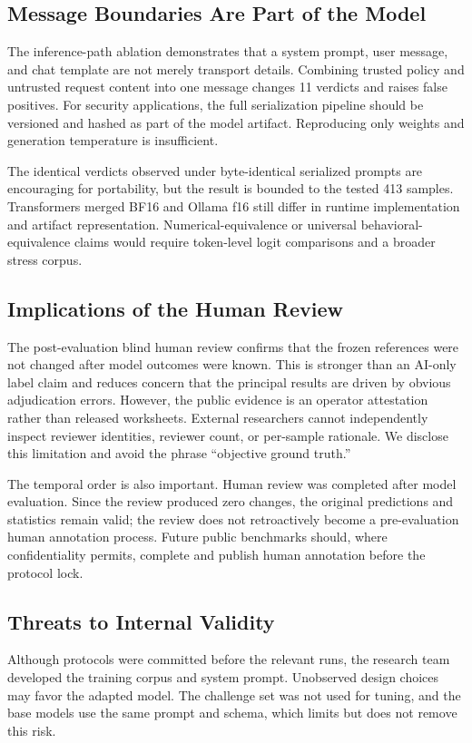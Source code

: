 \subsection{Message Boundaries Are Part of the Model}
The inference-path ablation demonstrates that a system prompt, user message, and chat template are not merely transport details. Combining trusted policy and untrusted request content into one message changes 11 verdicts and raises false positives. For security applications, the full serialization pipeline should be versioned and hashed as part of the model artifact. Reproducing only weights and generation temperature is insufficient.

The identical verdicts observed under byte-identical serialized prompts are encouraging for portability, but the result is bounded to the tested 413 samples. Transformers merged BF16 and Ollama f16 still differ in runtime implementation and artifact representation. Numerical-equivalence or universal behavioral-equivalence claims would require token-level logit comparisons and a broader stress corpus.

\subsection{Implications of the Human Review}
The post-evaluation blind human review confirms that the frozen references were not changed after model outcomes were known. This is stronger than an AI-only label claim and reduces concern that the principal results are driven by obvious adjudication errors. However, the public evidence is an operator attestation rather than released worksheets. External researchers cannot independently inspect reviewer identities, reviewer count, or per-sample rationale. We disclose this limitation and avoid the phrase ``objective ground truth.''

The temporal order is also important. Human review was completed after model evaluation. Since the review produced zero changes, the original predictions and statistics remain valid; the review does not retroactively become a pre-evaluation human annotation process. Future public benchmarks should, where confidentiality permits, complete and publish human annotation before the protocol lock.

\subsection{Threats to Internal Validity}
Although protocols were committed before the relevant runs, the research team developed the training corpus and system prompt. Unobserved design choices may favor the adapted model. The challenge set was not used for tuning, and the base models use the same prompt and schema, which limits but does not remove this risk.

